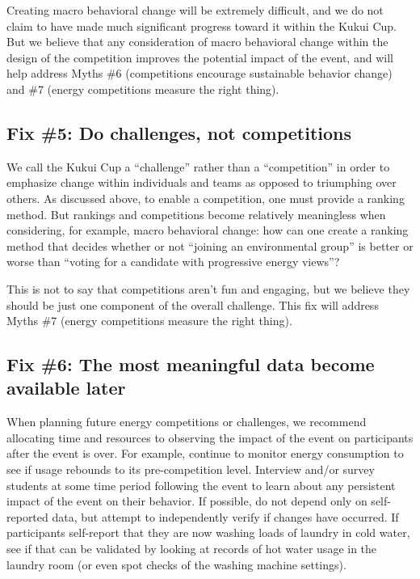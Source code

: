 \documentclass[jou]{apa} %
\begin{document}
Creating macro behavioral change will be extremely difficult, and we do not claim to have
made much significant progress toward it within the Kukui Cup.  But we believe that any
consideration of macro behavioral change within the design of the competition improves the
potential impact of the event, and will help address Myths \#6 (competitions encourage
sustainable behavior change) and \#7 (energy competitions measure the right thing).

\subsection{Fix \#5: Do challenges, not competitions}

We call the Kukui Cup a ``challenge'' rather than a ``competition'' in order to emphasize
change within individuals and teams as opposed to triumphing over others.  As discussed
above, to enable a competition, one must provide a ranking method.  But rankings and
competitions become relatively meaningless when considering, for example, macro behavioral
change: how can one create a ranking method that decides whether or not ``joining an
environmental group'' is better or worse than ``voting for a candidate with progressive
energy views''?

This is not to say that competitions aren't fun and engaging, but we believe they should
be just one component of the overall challenge.  This fix will address Myths \#7
(energy competitions measure the right thing).

\subsection{Fix \#6: The most meaningful data become available later}

When planning future energy competitions or challenges, we recommend allocating time and
resources to observing the impact of the event on participants after the event is over.
For example, continue to monitor energy consumption to see if usage rebounds to its
pre-competition level.  Interview and/or survey students at some time period following the
event to learn about any persistent impact of the event on their behavior.  If possible,
do not depend only on self-reported data, but attempt to independently verify if changes
have occurred.  If participants self-report that they are now washing loads of laundry in
cold water,  see if that can be validated by looking at records of hot water usage in the
laundry room (or even spot checks of the washing machine settings). 
\end{document}
